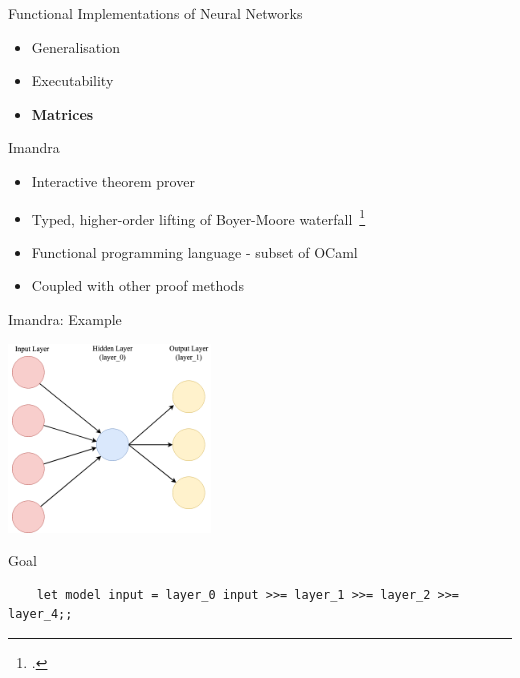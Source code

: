 \documentclass{beamer}
\begin{document}
\begin{frame}{Functional Implementations of Neural Networks}
\begin{itemize}
	\item<1-> Generalisation
	\item<2-> Executability
	\item<3-> \textbf{Matrices}
\end{itemize}
\end{frame}


\begin{frame}{Imandra}
	\begin{itemize}
		\item Interactive theorem prover
		\item Typed, higher-order lifting of Boyer-Moore waterfall~\footcite{BM79}
		\item Functional programming language - subset of OCaml
		\item Coupled with other proof methods
	\end{itemize}
\end{frame}


\begin{frame}[fragile]{Imandra: Example}

\includegraphics[height=5cm]{figures/mlp_iris.png}

\begin{block}{Goal}
\begin{lstlisting}
	let model input = layer_0 input >>= layer_1 >>= layer_2 >>= layer_4;;
\end{lstlisting}
\end{block}
\end{frame}
\end{document}
